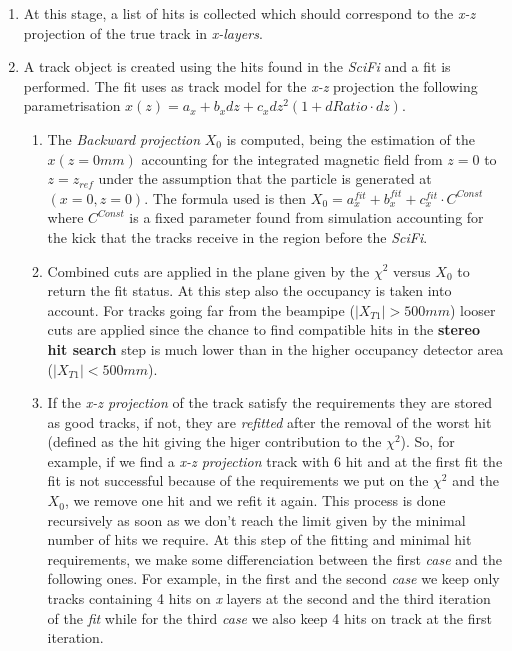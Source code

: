 \documentclass[paper=a4, fontsize=10pt]{scrartcl}
\numberwithin{equation}{section}		%
\numberwithin{figure}{section}			%
\numberwithin{table}{section}				%
\begin{document}
\begin{itemize}
\begin{enumerate}
      \item{At this stage, a list of hits is collected which should correspond to the \textit{x-z} projection of the true track in \textit{x-layers}.}
      \item{A track object is created using the hits found in the \textit{SciFi} and a fit is performed. The fit uses as track model for the \textit{x-z} projection the following parametrisation $x(z)=a_{x}+b_{x}dz+c_{x}dz^{2}(1+dRatio\cdot dz)$.}
        \begin{enumerate}
           \item{The \textit{Backward projection} $X_{0}$ is computed, being the estimation of the $x(z=0 mm)$ accounting for the integrated magnetic field from $z=0$ to $z=z_{ref}$ under the assumption that the particle is generated at $(x=0,z=0)$. The formula used is then $X_{0} = a^{fit}_{x}+b^{fit}_{x}+c^{fit}_{x} \cdot C^{Const}$ where $C^{Const}$ is a fixed parameter found from simulation accounting for the kick that the tracks receive in the region before the \textit{SciFi}. }
           \item{Combined cuts are applied in the plane given by the $\chi^{2}$ versus $X_{0}$ to return the fit status. At this step also the occupancy is taken into account. For tracks going far from the beampipe ($\left| X_{T1} \right| > 500 mm$) looser cuts are applied since the chance to find compatible hits in the \textbf{stereo hit search} step is much lower than in the higher occupancy detector area ($\left| X_{T1} \right| <500 mm$).}
           \item{If the \textit{x-z projection} of the track satisfy the requirements they are stored as good tracks, if not, they are \textit{refitted} after the removal of the worst hit (defined as the hit giving the higer contribution to the $\chi^{2}$). So, for example, if we find a \textit{x-z projection} track with 6 hit and at the first fit the fit is not successful because of the requirements we put on the $\chi^{2}$ and the $X_{0}$, we remove one hit and we refit it again. This process is done recursively as soon as we don't reach the limit given by the minimal number of hits we require. At this step of the fitting and minimal hit requirements, we make some differenciation between the first \textit{case} and the following ones. For example, in the first and the second \textit{case} we keep only tracks containing 4 hits on \textit{x} layers at the second and the third iteration of the \textit{fit} while for the third \textit{case} we also keep 4 hits on track at the first iteration.}

\end{enumerate}
\end{enumerate}
\end{itemize}
\end{document}
